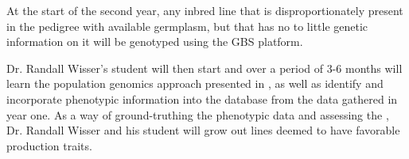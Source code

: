 \documentclass[draft,12pt]{article}
\begin{document}
At the start of the second year, any inbred line that is disproportionately present in the pedigree with available germplasm, but that has no to little genetic information on it will be genotyped using the GBS platform. 

Dr. Randall Wisser's student will then start and over a period of 3-6 months will learn the population genomics approach presented in \citep{Berg:2014bs}, as well as identify and incorporate phenotypic information into the database from the data gathered in year one. 
As a way of ground-truthing the phenotypic data and assessing the , Dr. Randall Wisser and his student will grow out lines deemed to have favorable production traits.


\end{document}

